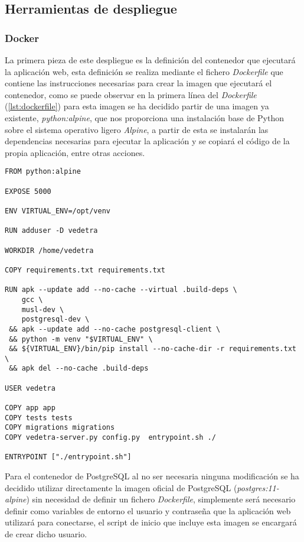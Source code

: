 \documentclass[../proyecto.tex]{subfiles}
\begin{document}
\subsection{Herramientas de despliegue}

\subsubsection{Docker}

La primera pieza de este despliegue es la definición del contenedor que ejecutará la aplicación web, esta definición se realiza mediante el fichero \textit{Dockerfile} que contiene las instrucciones necesarias para crear la imagen que ejecutará el contenedor, como se puede observar en la primera línea del \textit{Dockerfile} (\autoref{lst:dockerfile}) para esta imagen se ha decidido partir de una imagen ya existente, \textit{python:alpine}, que nos proporciona una instalación base de Python sobre el sistema operativo ligero \textit{Alpine}, a partir de esta se instalarán las dependencias necesarias para ejecutar la aplicación y se copiará el código de la propia aplicación, entre otras acciones.\\

\begin{lstlisting}[caption=Dockerfile del servidor web, captionpos=b, frame=single, label={lst:dockerfile}]
FROM python:alpine

EXPOSE 5000

ENV VIRTUAL_ENV=/opt/venv

RUN adduser -D vedetra

WORKDIR /home/vedetra

COPY requirements.txt requirements.txt

RUN apk --update add --no-cache --virtual .build-deps \
    gcc \
    musl-dev \
    postgresql-dev \
 && apk --update add --no-cache postgresql-client \
 && python -m venv "$VIRTUAL_ENV" \
 && ${VIRTUAL_ENV}/bin/pip install --no-cache-dir -r requirements.txt \
 && apk del --no-cache .build-deps

USER vedetra

COPY app app
COPY tests tests
COPY migrations migrations
COPY vedetra-server.py config.py  entrypoint.sh ./

ENTRYPOINT ["./entrypoint.sh"]
\end{lstlisting}

Para el contenedor de PostgreSQL al no ser necesaria ninguna modificación se ha decidido utilizar directamente la imagen oficial de PostgreSQL (\textit{postgres:11-alpine}) sin necesidad de definir un fichero \textit{Dockerfile}, simplemente será necesario definir como variables de entorno el usuario y contraseña que la aplicación web utilizará para conectarse, el script de inicio que incluye esta imagen se encargará de crear dicho usuario.\\
\end{document}

